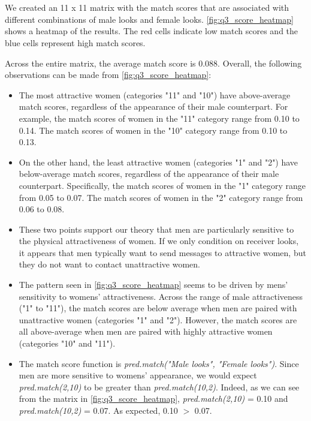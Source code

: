 \section{}
We created an 11 x 11 matrix with the match scores that are associated with different combinations of male looks and female looks. \vref{fig:q3_score_heatmap} shows a heatmap of the results. The red cells indicate low match scores and the blue cells represent high match scores. 

Across the entire matrix, the average match score is 0.088. Overall, the following observations can be made from \cref{fig:q3_score_heatmap}:
\begin{itemize}
\item The most attractive women (categories "11" and "10") have above-average match scores, regardless of the appearance of their male counterpart. For example, the match scores of women in the "11" category range from 0.10 to 0.14. The match scores of women in the "10" category range from 0.10 to 0.13.

\item On the other hand, the least attractive women (categories "1" and "2") have below-average match scores, regardless of the appearance of their male counterpart. Specifically, the  match scores of women in the "1" category range from 0.05 to 0.07. The match scores of women in the "2" category range from 0.06 to 0.08.

\item These two points support our theory that men are particularly sensitive to the physical attractiveness of women. If we only condition on receiver looks, it appears that men typically want to send messages to attractive women, but they do not want to contact unattractive women.

\item The pattern seen in \cref{fig:q3_score_heatmap} seems to be driven by mens' sensitivity to womens' attractiveness. Across the range of male attractiveness ("1" to "11"), the match scores are below average when men are paired with unattractive women (categories "1" and "2"). However, the match scores are all above-average when men are paired with highly attractive women (categories "10" and "11").

\item The match score function is \textit{pred.match("Male looks", "Female looks")}. Since men are more sensitive to womens' appearance, we would expect \textit{pred.match(2,10)} to be greater than \textit{pred.match(10,2)}. Indeed, as we can see from the matrix in \cref{fig:q3_score_heatmap}, \textit{pred.match(2,10)} = 0.10 and \textit{pred.match(10,2)} = 0.07. As expected, 0.10 $>$ 0.07.

\end{itemize}

